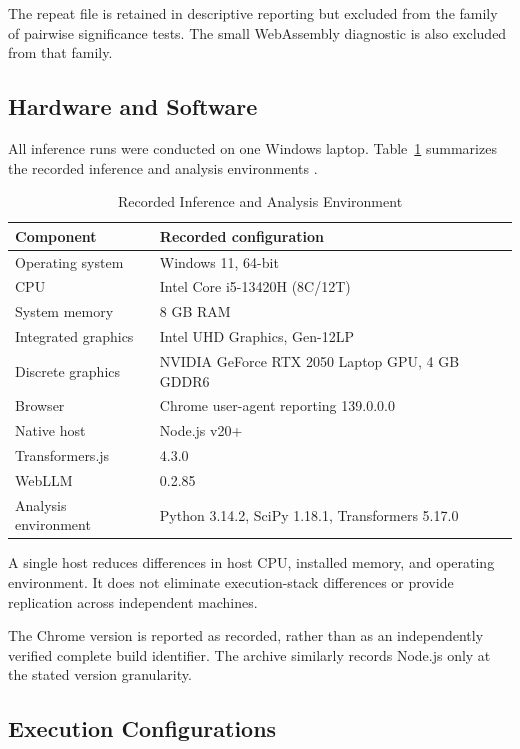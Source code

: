 \documentclass[conference]{IEEEtran}
\begin{document}
The repeat file is retained in descriptive reporting but
excluded from the family of pairwise significance tests.
The small WebAssembly diagnostic is also excluded from
that family.


\subsection{Hardware and Software}

All inference runs were conducted on one Windows laptop.
Table~\ref{tab:environment} summarizes the recorded
inference and analysis environments \cite{repository}.

\begin{table}[t]
\caption{Recorded Inference and Analysis Environment}
\label{tab:environment}
\centering
\footnotesize
\begin{tabular}{@{}
p{}
p{}
@{}}
\toprule
Component & Recorded configuration\\
\midrule
Operating system & Windows 11, 64-bit\\
CPU & Intel Core i5-13420H (8C/12T)\\
System memory & 8 GB RAM\\
Integrated graphics & Intel UHD Graphics, Gen-12LP\\
Discrete graphics &
NVIDIA GeForce RTX 2050 Laptop GPU, 4 GB GDDR6\\
Browser & Chrome user-agent reporting 139.0.0.0\\
Native host & Node.js v20+\\
Transformers.js & 4.3.0\\
WebLLM & 0.2.85\\
Analysis environment & Python 3.14.2, SciPy 1.18.1, Transformers 5.17.0\\
\bottomrule
\end{tabular}
\end{table}

A single host reduces differences in host CPU, installed
memory, and operating environment. It does not eliminate
execution-stack differences or provide replication across
independent machines.

The Chrome version is reported as recorded, rather than as
an independently verified complete build identifier.
The archive similarly records Node.js only at the stated
version granularity.


\subsection{Execution Configurations}
\end{document}
